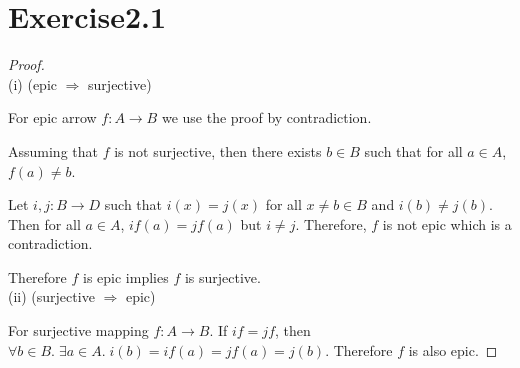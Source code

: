 \documentclass{article}
\begin{document}
    \section*{Exercise2.1}
    \begin{proof}
        $ $\\
        (i) (epic $\Rightarrow$ surjective)

        For epic arrow $f:A\rightarrow B$ we use the proof by contradiction.
        
        Assuming that $f$ is not surjective, then there exists $b\in B$ such that for all $a\in A$, $f(a)\ne b$. 
        
        Let $i,j : B\rightarrow D$ such that $i(x)=j(x)$ for all $x\ne b\in B$ and $i(b)\ne j(b)$. Then for all $a\in A$, $if(a) = jf(a)$ but $i\ne j$. Therefore, $f$ is not epic which is a contradiction.

        Therefore $f$ is epic implies $f$ is surjective.\\
        (ii) (surjective $\Rightarrow$ epic)

        For surjective mapping $f:A\rightarrow B$. If $if = jf$, then $\forall b\in B.\; \exists a\in A.\; i(b)=if(a)=jf(a)=j(b)$. Therefore $f$ is also epic.
    \end{proof}

    
\end{document}
